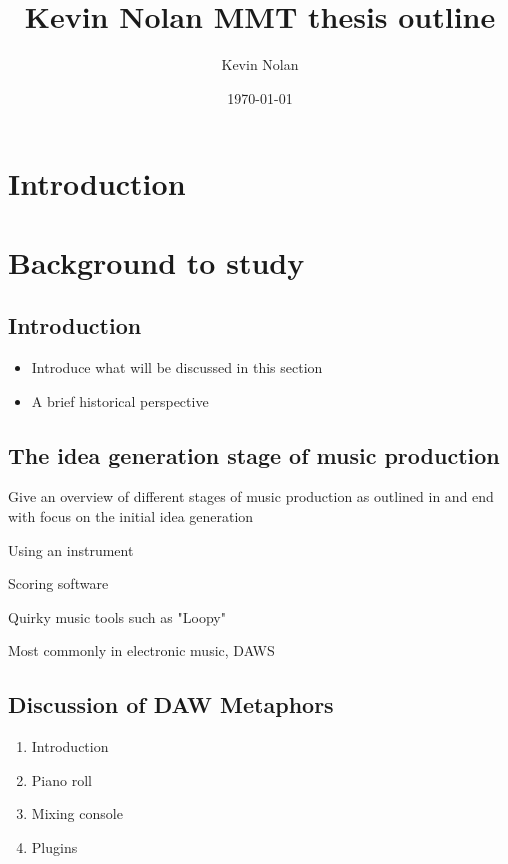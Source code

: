 \documentclass[a4paper,12pt]{article}
\author{Kevin Nolan}
\date{\today}
\title{Kevin Nolan MMT thesis outline}
\begin{document}
\maketitle
\tableofcontents


\section{Introduction}
\label{sec:orgcfcd553}

\section{Background to study}
\label{sec:org97ad61c}
\subsection{Introduction}
\label{sec:org6a91cc1}
\begin{itemize}
\item Introduce what will be discussed in this section
\item A brief historical perspective
\end{itemize}
\subsection{The idea generation stage of music production}
\label{sec:orgee698d6}
\begin{description}
\item[{Introduction}] Give an overview of different stages of music production
as outlined in \cite{duignan_computer_2008} and end with
focus on the initial idea generation
\item Using an instrument
\item Scoring software
\item Quirky music tools such as "Loopy"
\item Most commonly in electronic music, DAWS
\end{description}
\subsection{Discussion of DAW Metaphors}
\label{sec:orgc1d4147}
\begin{enumerate}
\item Introduction
\item Piano roll
\item Mixing console
\item Plugins
\end{enumerate}
\end{document}

